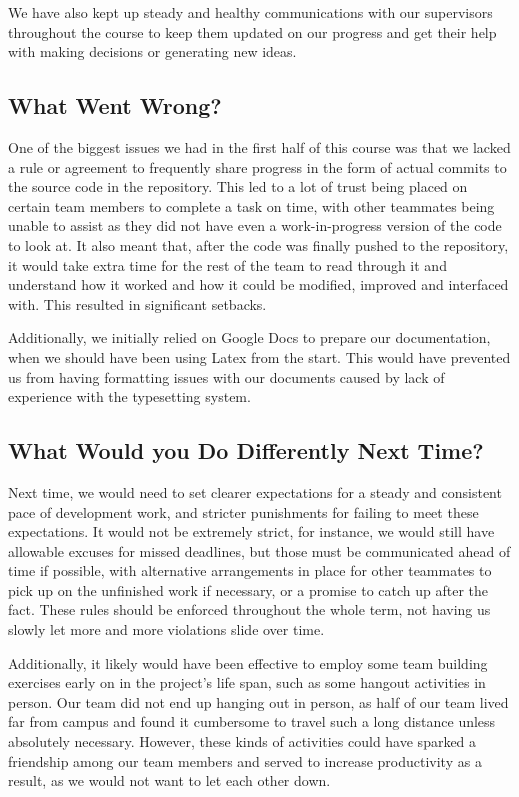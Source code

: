 \documentclass{article}
\begin{document}
We have also kept up steady and healthy communications with our supervisors 
throughout the course to keep them updated on our progress and get their help 
with making decisions or generating new ideas.

\subsection{What Went Wrong?}

One of the biggest issues we had in the first half of this course was that 
we lacked a rule or agreement to frequently share progress in the form of 
actual commits to the source code in the repository. This led to a lot of 
trust being placed on certain team members to complete a task on time, with 
other teammates being unable to assist as they did not have even a work-in-progress 
version of the code to look at. It also meant that, after the code was finally pushed 
to the repository, it would take extra time for the rest of the team to read 
through it and understand how it worked and how it could be modified, improved and 
interfaced with. This resulted in significant setbacks.

Additionally, we initially relied on Google Docs to prepare our documentation, 
when we should have been using Latex from the start. This would have prevented us 
from having formatting issues with our documents caused by lack of experience with 
the typesetting system.

\subsection{What Would you Do Differently Next Time?}

Next time, we would need to set clearer expectations for a steady and consistent 
pace of development work, and stricter punishments for failing to meet these 
expectations. It would not be extremely strict, for instance, we would still have 
allowable excuses for missed deadlines, but those must be communicated ahead of time 
if possible, with alternative arrangements in place for other teammates to pick up 
on the unfinished work if necessary, or a promise to catch up after the fact. These 
rules should be enforced throughout the whole term, not having us slowly let more 
and more violations slide over time.

Additionally, it likely would have been effective to employ some team building 
exercises early on in the project's life span, such as some hangout activities 
in person. Our team did not end up hanging out in person, as half of our team 
lived far from campus and found it cumbersome to travel such a long distance 
unless absolutely necessary. However, these kinds of activities could have 
sparked a friendship among our team members and served to increase productivity 
as a result, as we would not want to let each other down.
\end{document}
